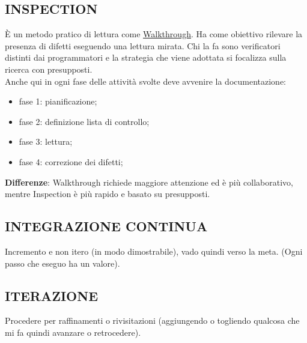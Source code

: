		\subsection{INSPECTION}		\label{inspection}
		È un metodo pratico di lettura come \underline{\hyperref[walkthrough]{Walkthrough}}. Ha come obiettivo rilevare la presenza di difetti eseguendo una lettura mirata. Chi la fa sono verificatori distinti dai programmatori e la strategia che viene adottata si focalizza sulla ricerca con presupposti. \\
		Anche qui in ogni fase delle attività svolte deve avvenire la documentazione:
		\begin{itemize}
			\item fase 1: pianificazione;
			\item fase 2: definizione lista di controllo;
			\item fase 3: lettura;
			\item fase 4: correzione dei difetti;
		\end{itemize}
		\textbf{Differenze}: Walkthrough richiede maggiore attenzione ed è più collaborativo, mentre Inspection è più rapido e basato su presupposti.
		
		\subsection{INTEGRAZIONE CONTINUA}  \label{integrazione}
		Incremento e non itero (in modo dimostrabile), vado quindi verso la meta. (Ogni passo che eseguo ha un valore).
		
		
		\subsection{ITERAZIONE}  \label{iterazione}
		Procedere per raffinamenti o rivisitazioni (aggiungendo o togliendo qualcosa che mi fa quindi avanzare o retrocedere).
	
	
	
